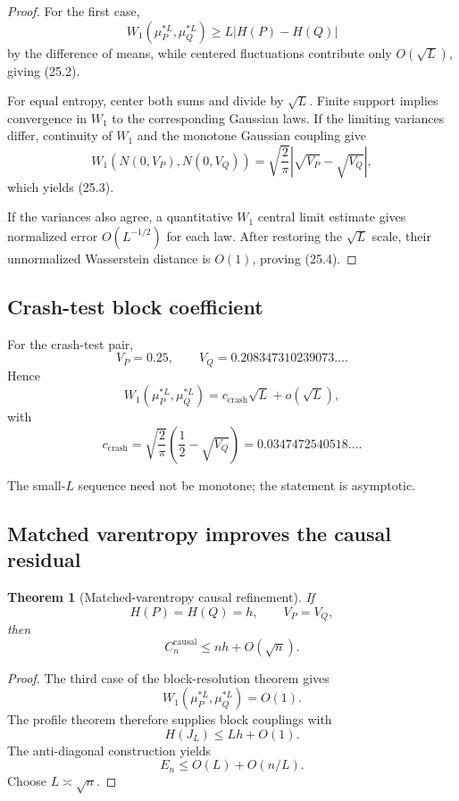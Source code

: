 \documentclass[11pt,a4paper]{article}
\newtheorem{theorem}{Theorem}[section]
\newcommand{\Ccausal}{C^{\mathrm{causal}}}
\newcommand{\1}{\mathbf 1}
\begin{document}
\begin{proof}
For the first case,
\[
W_1(\mu_P^{*L},\mu_Q^{*L})
\ge
L|H(P)-H(Q)|
\]
by the difference of means, while centered fluctuations contribute only
\(O(\sqrt L)\), giving (25.2).

For equal entropy, center both sums and divide by \(\sqrt L\).
Finite support implies convergence in \(W_1\) to the corresponding
Gaussian laws.
If the limiting variances differ, continuity of \(W_1\) and the monotone
Gaussian coupling give
\[
W_1(N(0,V_P),N(0,V_Q))
=
\sqrt{\frac2\pi}
|\sqrt{V_P}-\sqrt{V_Q}|,
\]
which yields (25.3).

If the variances also agree, a quantitative \(W_1\) central limit
estimate gives normalized error \(O(L^{-1/2})\) for each law.
After restoring the \(\sqrt L\) scale, their unnormalized
Wasserstein distance is \(O(1)\), proving (25.4).
\end{proof}


\subsection{Crash-test block coefficient}

For the crash-test pair,
\[
V_P=0.25,
\qquad
V_Q=0.208347310239073\ldots.
\]
Hence
\[
\boxed{
W_1(\mu_P^{*L},\mu_Q^{*L})
=
c_{\mathrm{crash}}\sqrt L+o(\sqrt L),
}
\tag{25.5}
\]
with
\[
c_{\mathrm{crash}}
=
\sqrt{\frac2\pi}
\left(
\frac12-\sqrt{V_Q}
\right)
=
0.0347472540518\ldots.
\tag{25.6}
\]

The small-\(L\) sequence need not be monotone; the statement is
asymptotic.


\subsection{Matched varentropy improves the causal residual}

\begin{theorem}[Matched-varentropy causal refinement]
If
\[
H(P)=H(Q)=h,
\qquad
V_P=V_Q,
\]
then
\[
\boxed{
\Ccausal_n
\le
nh+O(\sqrt n).
}
\tag{25.7}
\]
\end{theorem}

\begin{proof}
The third case of the block-resolution theorem gives
\[
W_1(\mu_P^{*L},\mu_Q^{*L})=O(1).
\]
The profile theorem therefore supplies block couplings with
\[
H(J_L)\le Lh+O(1).
\]
The anti-diagonal construction yields
\[
E_n
\le
O(L)+O(n/L).
\]
Choose \(L\asymp\sqrt n\).
\end{proof}
\end{document}

